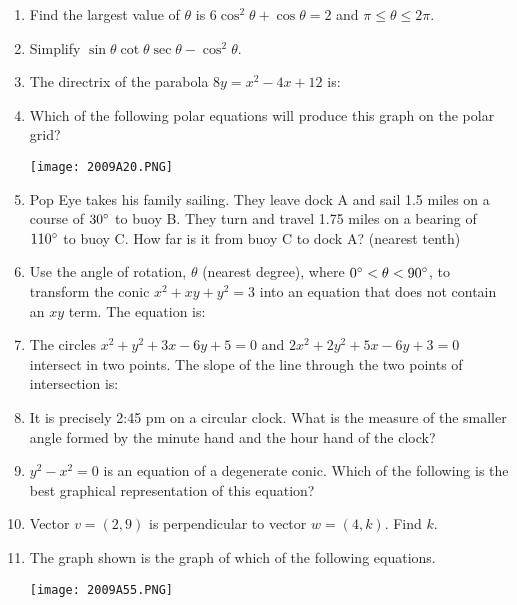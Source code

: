 \documentclass[../uilmath.tex]{subfiles}
\begin{document}
\begin{enumerate}[label=\bfseries\arabic*.]
    \item %
    Find the largest value of $\theta$ is $6\cos^2\theta + \cos\theta = 2$ and $\pi\leq \theta\leq 2\pi$.

    \item %
    Simplify $\sin\theta\cot\theta\sec\theta-\cos^2\theta$.

    \item %
    The directrix of the parabola $8y=x^2-4x+12$ is: 

    \item %
    Which of the following polar equations will produce this graph on the polar grid?
    \begin{center}
        \texttt{[image: 2009A20.PNG]}
    \end{center}

    \item %
    Pop Eye takes his family sailing. They leave dock A and sail 1.5 miles on a course of $30\degree$ to buoy B. They turn and travel 1.75 miles 
    on a bearing of $110\degree$ to buoy C. How far is it from buoy C to dock A? (nearest tenth)

    \item %
    Use the angle of rotation, $\theta$ (nearest degree), where $0\degree<\theta<90\degree$, to transform the conic $x^2+xy+y^2=3$ into an equation 
    that does not contain an $xy$ term. The equation is:

    \item %
    The circles $x^2+y^2+3x-6y+5=0$ and $2x^2+2y^2+5x-6y+3=0$ intersect in two points. The slope of the line through the two points of intersection is:
    
    \item %
    It is precisely 2:45 pm on a circular clock. What is the measure of the smaller angle formed by the minute hand and the hour hand of the clock?

    \item %
    $y^2-x^2=0$ is an equation of a degenerate conic. Which of the following is the best graphical representation of this equation?

    \item %
    Vector $v=(2,9)$ is perpendicular to vector $w=(4,k)$. Find $k$.

    \item %
    The graph shown is the graph of which of the following equations.
    \begin{center}
        \texttt{[image: 2009A55.PNG]}
    \end{center}


\end{enumerate}
\end{document}
